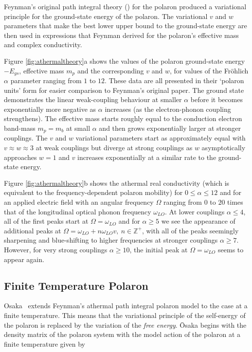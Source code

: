 Feynman's original path integral theory (\cite{feynman_slow_1955}) for the polaron produced a variational principle for the ground-state energy of the polaron. The variational $v$ and $w$ parameters that make the best lower upper bound to the ground-state energy are then used in expressions that Feynman derived for the polaron's effective mass and complex conductivity. 

Figure \ref{fig:athermaltheory}a shows the values of the polaron ground-state energy $-E_{gs}$, effective mass $m_p$ and the corresponding $v$ and $w$, for values of the Fr\"ohlich $\alpha$ parameter ranging from $1$ to $12$. These data are all presented in their `polaron units' form for easier comparison to Feynman's original paper. The ground state demonstrates the linear weak-coupling behaviour at smaller $\alpha$ before it becomes exponentially more negative as $\alpha$ increases (as the electron-phonon coupling strengthens). The effective mass starts roughly equal to the conduction electron band-mass $m_p = m_b $ at small $\alpha$ and then grows exponentially larger at stronger couplings. The $v$ and $w$ variational parameters start as approximately equal with $v \approx w \approx 3$ at weak couplings but diverge at strong couplings as $w$ asymptotically approaches $w = 1$ and $v$ increases exponentially at a similar rate to the ground-state energy. 

Figure \ref{fig:athermaltheory}b shows the athermal real conductivity (which is equivalent to the frequency-dependent polaron mobility) for $0 \leq \alpha \leq 12$ and for an applied electric field with an angular frequency $\Omega$ ranging from $0$ to $20$ times that of the longitudinal optical phonon frequency $\omega_{LO}$. At lower couplings $\alpha \leq 4$, all of the first peaks start at $\Omega = \omega_{LO}$ and for $\alpha \geq 5$ we see the appearance of additional peaks at $\Omega = \omega_{LO} + n \omega_{LO} v,\ n \in \mathbb{Z}^+$, with all of the peaks seemingly sharpening and blue-shifting to higher frequencies at stronger couplings $\alpha \geq 7$. However, for very strong couplings $\alpha \geq 10$, the initial peak at $\Omega = \omega_{LO}$ seems to appear again.

\subsection{Finite Temperature Polaron}
\label{subsec:2-2-3}

Osaka~\cite{osaka_polaron_1959} extends Feynman's athermal path integral polaron model to the case at a finite temperature. This means that the variational principle of the self-energy of the polaron is replaced by the variation of the \emph{free energy}. \=Osaka begins with the density matrix of the polaron system with the model action of the polaron at a finite temperature given by

